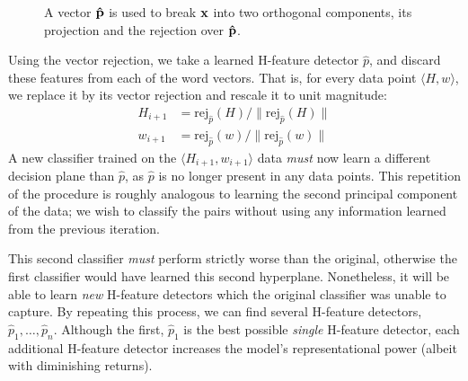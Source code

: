 \begin{figure}
\centering
{}
\caption{A vector ${\mathbf{\hat p}}$ is used to break ${\mathbf{x}}$ into two orthogonal components,
its projection and the rejection over ${\mathbf{\hat p}}$.}
\label{fig:vecproj}
\end{figure}

Using the vector rejection, we take a learned H-feature detector $\hat p$,
and discard these features from each of the word vectors. That is, for every data
point $\langle H, w\rangle$, we replace it by its vector rejection and rescale
it to unit magnitude:
\begin{align*}
  H_{i+1} & = \text{rej}_{\hat p}(H) / \|\text{rej}_{\hat p}(H)\|\\
  w_{i+1} & = \text{rej}_{\hat p}(w) / \|\text{rej}_{\hat p}(w)\|
\end{align*}
A new classifier trained on the $\langle H_{i+1}, w_{i+1}\rangle$ data {\em must} now learn
a different decision plane than $\hat p$, as $\hat p$ is no longer present
in any data points. This repetition of the procedure is roughly analogous to
learning the second principal component of the data; we wish to classify the
pairs without using any information learned from the previous iteration.

This second classifier {\em must} perform strictly worse than the original,
otherwise the first classifier would have learned this second hyperplane.
Nonetheless, it will be able to learn {\em new} H-feature detectors
which the original classifier was unable to capture. By repeating this process,
we can find several H-feature detectors, $\hat p_1, \ldots, \hat p_n$. Although
the first, $\hat p_1$ is the best possible {\em single} H-feature detector,
each additional H-feature detector increases the model's representational power
(albeit with diminishing returns).

